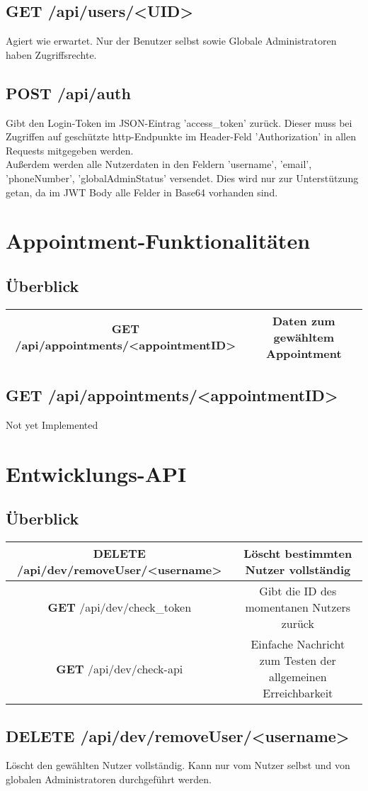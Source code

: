 \documentclass[11pt,a4paper]{article}
\begin{document}
\subsection{\textbf{GET} /api/users/<UID>}
Agiert wie erwartet. Nur der Benutzer selbst sowie Globale Administratoren haben Zugriffsrechte.
\subsection{\textbf{POST} /api/auth}
Gibt den Login-Token im JSON-Eintrag 'access\_token' zurück. Dieser muss bei Zugriffen auf geschützte http-Endpunkte im Header-Feld 'Authorization' in allen Requests mitgegeben werden.\\
Außerdem werden alle Nutzerdaten in den Feldern 'username', 'email', 'phoneNumber', 'globalAdminStatus' versendet. Dies wird nur zur Unterstützung getan, da im JWT Body alle Felder in Base64 vorhanden sind.
\section{Appointment-Funktionalitäten}
\subsection{Überblick}
\begin{tabular}{|c|c|}
\hline
\textbf{GET} /api/appointments/<appointmentID> & Daten zum gewähltem Appointment \\
\hline
\end{tabular}

\subsection{\textbf{GET} /api/appointments/<appointmentID>}
Not yet Implemented

\section{Entwicklungs-API}
\subsection{Überblick}

\begin{tabular}{|c|c|}
\hline
\textbf{DELETE} /api/dev/removeUser/<username> & Löscht bestimmten Nutzer vollständig \\
\hline
\textbf{GET} /api/dev/check\_token & Gibt die ID des momentanen Nutzers zurück \\
\hline
\textbf{GET} /api/dev/check-api & Einfache Nachricht zum Testen der allgemeinen Erreichbarkeit \\
\hline
\end{tabular}

\subsection{\textbf{DELETE} /api/dev/removeUser/<username>}
Löscht den gewählten Nutzer vollständig. Kann nur vom Nutzer selbst und von globalen Administratoren durchgeführt werden.
\end{document}
